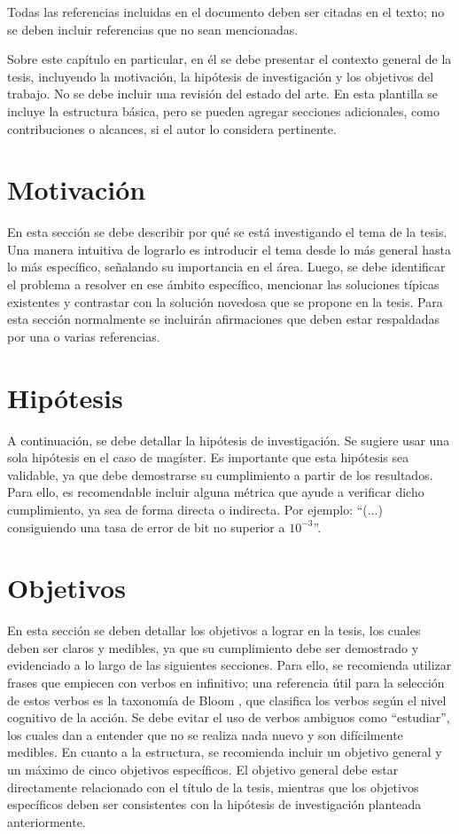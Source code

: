 Todas las referencias incluidas en el documento deben ser citadas en el texto; no se deben incluir referencias que no sean mencionadas.

Sobre este capítulo en particular, en él se debe presentar el contexto general de la tesis, incluyendo la motivación, la hipótesis de investigación y los objetivos del trabajo. No se debe incluir una revisión del estado del arte. En esta plantilla se incluye la estructura básica, pero se pueden agregar secciones adicionales, como contribuciones o alcances, si el autor lo considera pertinente.

\section{Motivación}

En esta sección se debe describir por qué se está investigando el tema de la tesis. Una manera intuitiva de lograrlo es introducir el tema desde lo más general hasta lo más específico, señalando su importancia en el área. Luego, se debe identificar el problema a resolver en ese ámbito específico, mencionar las soluciones típicas existentes y contrastar con la solución novedosa que se propone en la tesis. Para esta sección normalmente se incluirán afirmaciones que deben estar respaldadas por una o varias referencias. 
\section{Hipótesis}
A continuación, se debe detallar la hipótesis de investigación. Se sugiere usar una sola hipótesis en el caso de magíster. Es importante que esta hipótesis sea validable, ya que debe demostrarse su cumplimiento a partir de los resultados. Para ello, es recomendable incluir alguna métrica que ayude a verificar dicho cumplimiento, ya sea de forma directa o indirecta. Por ejemplo: ``(...) consiguiendo una tasa de error de bit no superior a $10^{-3}$''.

\section{Objetivos}
En esta sección se deben detallar los objetivos a lograr en la tesis, los cuales deben ser claros y medibles, ya que su cumplimiento debe ser demostrado y evidenciado a lo largo de las siguientes secciones. Para ello, se recomienda utilizar frases que empiecen con verbos en infinitivo; una referencia útil para la selección de estos verbos es la taxonomía de Bloom \cite{bloom_taxonomy}, que clasifica los verbos según el nivel cognitivo de la acción. Se debe evitar el uso de verbos ambiguos como ``estudiar'', los cuales dan a entender que no se realiza nada nuevo y son difícilmente medibles.
En cuanto a la estructura, se recomienda incluir un objetivo general y un máximo de cinco objetivos específicos. El objetivo general debe estar directamente relacionado con el título de la tesis, mientras que los objetivos específicos deben ser consistentes con la hipótesis de investigación planteada anteriormente.
